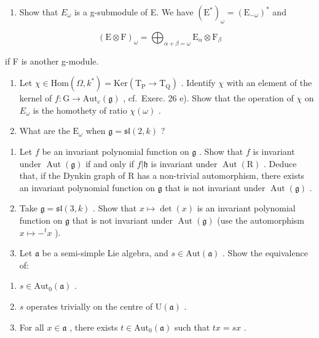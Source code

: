 \begin{enumerate}
\def\labelenumi{\alph{enumi})}
\tightlist
\item
  Show that \(E_{\omega}\) is a g-submodule of E. We have \((\mathrm{E}^{*})_{\omega} = (\mathrm{E}_{-\omega})^{*}\) and
\end{enumerate}

\[
(\mathrm{E} \otimes \mathrm{F}) _ {\omega} = \bigoplus_ {\alpha + \beta = \omega} \mathrm{E} _ {\alpha} \otimes \mathrm{F} _ {\beta}
\]

if F is another g-module.

\begin{enumerate}
\def\labelenumi{\alph{enumi})}
\setcounter{enumi}{1}
\item
  Let \(\chi\in\mathrm{Hom}(\varOmega,k^{*})=\mathrm{Ker}(\mathrm{T}_{\mathrm{P}}\to\mathrm{T}_{\mathrm{Q}})\) . Identify \(\chi\) with an element of the kernel of \(f:\mathrm{G}\to\mathrm{Aut}_{e}(\mathfrak{g})\) , cf.~Exerc. 26 e). Show that the operation of \(\chi\) on \(E_{\omega}\) is the homothety of ratio \(\chi(\omega)\) .
\item
  What are the \(\mathrm{E}_{\omega}\) when \(\mathfrak{g} = \mathfrak{sl}(2,k)\) ?
\end{enumerate}


\begin{enumerate}
\def\labelenumi{\arabic{enumi})}
\item
  Let \(f\) be an invariant polynomial function on \(\mathfrak{g}\) . Show that \(f\) is invariant under \(\operatorname{Aut}(\mathfrak{g})\) if and only if \(f|\mathfrak{h}\) is invariant under \(\operatorname{Aut}(\mathrm{R})\) . Deduce that, if the Dynkin graph of \(\mathrm{R}\) has a non-trivial automorphism, there exists an invariant polynomial function on \(\mathfrak{g}\) that is not invariant under \(\operatorname{Aut}(\mathfrak{g})\) .
\item
  Take \(\mathfrak{g} = \mathfrak{sl}(3,k)\) . Show that \(x\mapsto \det (x)\) is an invariant polynomial function on \(\mathfrak{g}\) that is not invariant under \(\operatorname {Aut}(\mathfrak{g})\) (use the automorphism \(x\mapsto -^t x\) ).
\item
  Let \(\mathfrak{a}\) be a semi-simple Lie algebra, and \(s\in \mathrm{Aut}(\mathfrak{a})\) . Show the equivalence of:
\end{enumerate}

\begin{enumerate}
\def\labelenumi{(\roman{enumi})}
\item
  \(s \in \text{Aut}_{0}(\mathfrak{a})\) .
\item
  \(s\) operates trivially on the centre of \(\mathrm{U}(\mathfrak{a})\) .
\item
  For all \(x \in \mathfrak{a}\) , there exists \(t \in \mathrm{Aut}_0(\mathfrak{a})\) such that \(tx = sx\) .
\end{enumerate}

